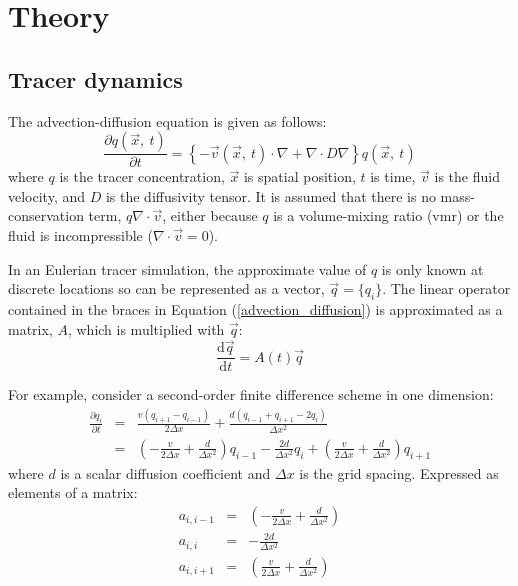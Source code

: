 \documentclass{article}
\begin{document}
\newcommand{\vect}[1]{\ensuremath{\vec #1}}

\tableofcontents

\section{Theory}

\subsection{Tracer dynamics}

The advection-diffusion equation is given as follows:
\begin{equation}
\frac{\partial q(\vect x, ~ t)}{\partial t} = \left \lbrace -\vect v(\vect x, ~t) \cdot \nabla + \nabla \cdot D \nabla \right \rbrace q(\vect x, ~ t)
\label{advection_diffusion}
\end{equation}
where $q$ is the tracer concentration, $\vect x$ is spatial position, 
$t$ is time, $\vect v$ is the fluid velocity, and $D$ is the diffusivity tensor.
It is assumed that there is no mass-conservation term, $q \nabla \cdot \vect v$,
either because $q$ is a volume-mixing ratio (vmr) or 
the fluid is incompressible ($\nabla \cdot \vec v = 0$).

In an Eulerian tracer simulation, the approximate value of $q$
is only known at discrete locations so can be represented as a vector,
$\vect q=\lbrace q_i \rbrace$.
The linear operator contained in the braces in Equation 
(\ref{advection_diffusion}) is approximated as a matrix, $A$, which is 
multiplied with $\vect q$:
\begin{equation}
\frac{\mathrm d \vect q}{\mathrm d t} = A(t) \vect q
\label{linear_ODE}
\end{equation}

For example, consider a second-order finite difference scheme in one dimension:
\begin{eqnarray}
\frac{\partial q_i}{\partial t} & = & \frac{v(q_{i+1} - q_{i-1})}{2 \Delta x} +
	\frac{d (q_{i-1} + q_{i+1} - 2 q_i)}{\Delta x^2} \\
& = & \left (- \frac{v}{2 \Delta x} + \frac{d}{\Delta x^2} \right ) q_{i-1} -
	\frac{2 d}{\Delta x^2} q_i + 
	\left (\frac{v}{2 \Delta x} + \frac{d}{\Delta x^2} \right ) q_{i+1} \label{finite_difference_diffusion}
\end{eqnarray}
where $d$ is a scalar diffusion coefficient and $\Delta x$ is the grid spacing.
Expressed as elements of a matrix:
\begin{eqnarray}
a_{i,i-1} & = & \left (- \frac{v}{2 \Delta x} + \frac{d}{\Delta x^2} \right ) \\
	a_{i,i} & = & -\frac{2 d}{\Delta x^2} \\
a_{i,i+1} & = & \left (\frac{v}{2 \Delta x} + \frac{d}{\Delta x^2} \right )
\end{eqnarray}
\end{document}
